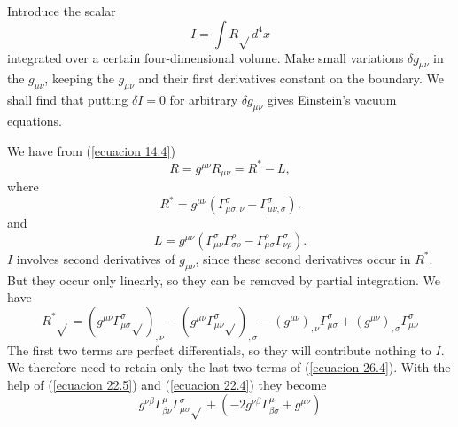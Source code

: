 Introduce the scalar
\begin{equation}
 \label{ecuacion 26.1}
 I = \int{R \sqrt{} d^4 x}
\end{equation}
integrated over a certain four-dimensional volume. Make small variations $\delta g_{\mu\nu}$ in the $g_{\mu\nu}$, 
keeping the $g_{\mu\nu}$ and their first derivatives constant on the boundary. We shall find that putting $\delta I = 
0$ for arbitrary $\delta g_{\mu\nu}$ gives Einstein's vacuum equations.

We have from (\ref{ecuacion 14.4})
\[
 R = g^{\mu\nu} R_{\mu\nu} = R^{*} - L,
\]
where
\begin{equation}
 \label{ecuacion 26.2}
 R^{*} = g^{\mu\nu} \left( \Gamma^\sigma_{\mu\sigma,\nu} - \Gamma^\sigma_{\mu\nu,\sigma} \right).
\end{equation}
and
\begin{equation}
 \label{ecuacion 26.3}
 L = g^{\mu\nu} \left( 
    \Gamma^\sigma_{\mu\nu}\Gamma^\rho_{\sigma\rho} - \Gamma^\rho_{\mu\sigma}\Gamma^\sigma_{\nu\rho}
 \right).
\end{equation}
$I$ involves second derivatives of $g_{\mu\nu}$, since these second derivatives occur in $R^{*}$. But they occur only 
linearly, so they can be removed by partial integration. We have
\begin{equation}
 \label{ecuacion 26.4}
 R^{*}\sqrt{} = \left( 
    g^{\mu\nu} \Gamma^\sigma_{\mu\sigma} \sqrt{}
 \right)_{,\nu} -
 \left( 
    g^{\mu\nu} \Gamma^\sigma_{\mu\nu} \sqrt{}
 \right)_{,\sigma}
 -\left(
    g^{\mu\nu}
 \right)_{,\nu} \Gamma^\sigma_{\mu\sigma}
 +\left(
    g^{\mu\nu}
 \right)_{,\sigma} \Gamma^\sigma_{\mu\nu}
\end{equation}
The first two terms are perfect differentials, so they will contribute nothing to $I$. We therefore need to retain only 
the last two terms of (\ref{ecuacion 26.4}). With the help of (\ref{ecuacion 22.5}) and (\ref{ecuacion 22.4}) they 
become
\[
 g^{\nu\beta}\Gamma^\mu_{\beta\nu}\Gamma^\sigma_{\mu\sigma}\sqrt{}
 + \left(
     -2 g^{\nu\beta} \Gamma^\mu_{\beta\sigma} + g^{\mu\nu}
 \right)
\]



